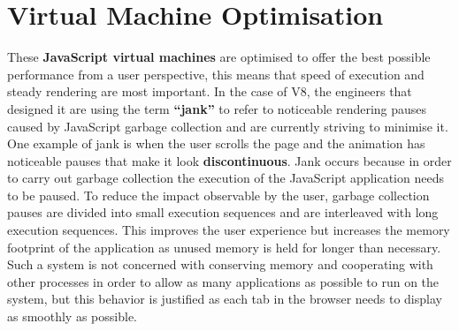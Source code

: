 \documentclass{l4proj}
\begin{document}
\section{Virtual Machine Optimisation}
\hspace*{3em} These \textbf{JavaScript virtual machines} are optimised to offer the best possible performance from a user perspective, this means that speed of execution and steady rendering are most important. In the case of V8, the engineers that designed it are using the term \textbf{``jank''} to refer to noticeable rendering pauses caused by JavaScript garbage collection and are currently striving to minimise it. One example of jank is when the user scrolls the page and the animation has noticeable pauses that make it look \textbf{discontinuous}. Jank occurs because in order to carry out garbage collection the execution of the JavaScript application needs to be paused. To reduce the impact observable by the user, garbage collection pauses are divided into small execution sequences and are interleaved with long execution sequences. This improves the user experience but increases the memory footprint of the application as unused memory is held for longer than necessary. Such a system is not concerned with conserving memory and cooperating with other processes in order to allow as many applications as possible to run on the system, but this behavior is justified as each tab in the browser needs to display as smoothly as possible.
\\\\%
\end{document}
